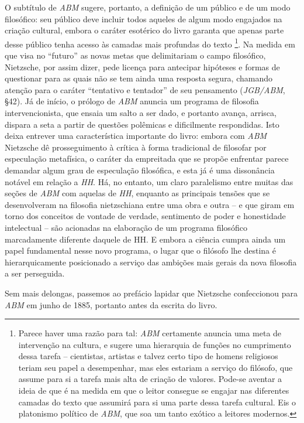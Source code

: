 \documentclass[
	12pt,				%
	openright,			%
	oneside,			%
	a4paper,			%
	english,			%
	french,				%
	spanish,			%
	brazil				%
	]{abntex2}
\begin{document}
	O subtítulo de \textit{ABM} sugere, portanto, a definição de um público e de um modo filosófico: seu público deve incluir todos aqueles de algum modo engajados na criação cultural, embora o caráter esotérico do livro garanta que apenas parte desse público tenha acesso às camadas mais profundas do texto
\footnote{Parece haver uma razão para tal: \textit{ABM} certamente anuncia uma meta de intervenção na cultura, e sugere uma hierarquia de funções no cumprimento dessa tarefa – cientistas, artistas e talvez certo tipo de homens religiosos teriam seu papel a desempenhar, mas eles estariam a serviço do filósofo, que assume para si a tarefa mais alta de criação de valores. Pode-se aventar a ideia de que é na medida em que o leitor consegue se engajar nas diferentes camadas do texto que assumirá para si uma parte dessa tarefa cultural. Eis o platonismo político de \textit{ABM}, que soa um tanto exótico a leitores modernos.}. 
Na medida em que visa no “futuro” as novas metas que delimitariam o campo filosófico, Nietzsche, por assim dizer, pede licença para antecipar hipóteses e formas de questionar para as quais não se tem ainda uma resposta segura, chamando atenção para o caráter “tentativo e tentador” de seu pensamento (\textit{JGB/ABM}, §42). Já de início, o prólogo de \textit{ABM} anuncia um programa de filosofia intervencionista, que ensaia um salto a ser dado, e portanto avança, arrisca, dispara a seta a partir de questões polêmicas e dificilmente respondidas. Isto deixa entrever uma característica importante do livro: embora com \textit{ABM} Nietzsche dê prosseguimento à crítica à forma tradicional de filosofar por especulação metafísica, o caráter da empreitada que se propõe enfrentar parece demandar algum grau de especulação filosófica, e esta já é uma dissonância notável em relação a \textit{HH}. Há, no entanto, um claro paralelismo entre muitas das seções de \textit{ABM} com aquelas de \textit{HH}, enquanto as principais tensões que se desenvolveram na filosofia nietzschiana entre uma obra e outra – e que giram em torno dos conceitos de vontade de verdade, sentimento de poder e honestidade intelectual – são acionadas na elaboração de um programa filosófico marcadamente diferente daquele de HH. E embora a ciência cumpra ainda um papel fundamental nesse novo programa, o lugar que o filósofo lhe destina é hierarquicamente posicionado a serviço das ambições mais gerais da nova filosofia a ser perseguida.

Sem mais delongas, passemos ao prefácio lapidar que Nietzsche confeccionou para \textit{ABM} em junho de 1885, portanto antes da escrita do livro.
\end{document}
